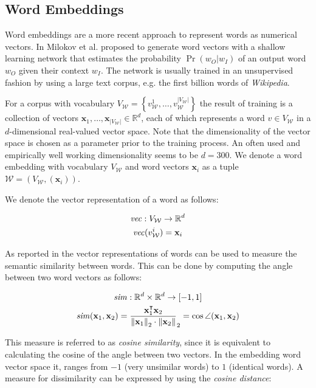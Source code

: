 \subsection{Word Embeddings}

Word embeddings are a more recent approach to represent words as numerical
vectors. In \cite{mikolov2013distributed} Milokov et al. proposed to generate
word vectors with a shallow learning network that estimates the
probability $\Pr(w_O|w_I)$ of an output word $w_O$ given their context $w_I$.
The network is usually trained in an unsupervised fashion by using a large
text corpus, e.g. the first billion words of \emph{Wikipedia}. 

For a corpus with vocabulary $V_\mathcal{W}=\left\{ v^1_\mathcal{W}, \ldots,
v^{|V_\mathcal{W}|}_\mathcal{W}\right\}$ the result of training is a collection
of vectors $\mathbf{x}_1, \ldots,\mathbf{x}_{|V_\mathcal{W}|} \in \mathbb{R}^d$, 
each of which represents a word $v \in V_\mathcal{W}$ in a
$d$-dimensional real-valued vector space. Note that the dimensionality of the
vector space is chosen as a parameter prior to the training process. An often
used and empirically well working dimensionality seems to be $d=300$. We
denote a word embedding with vocabulary $V_{\mathcal{W}}$ and 
word vectors $\mathbf{x}_i$ as a tuple $\mathcal{W}=(V_{\mathcal{W}},
(\mathbf{x}_i))$.

We denote the vector representation of a word as follows:

\begin{gather*}
	\mathit{vec}: V_\mathcal{W} \to \mathbb{R}^d \\
	\mathit{vec}(v^i_{\mathcal{W}}) = \mathbf{x}_i
\end{gather*}

As reported in \cite{mikolov2013distributed} the vector representations
of words can be used to measure the semantic similarity between words. This can
be done by computing the angle between two word vectors as follows:

\begin{gather*}
	\mathit{sim}: \mathbb{R}^d \times \mathbb{R}^d \to [-1, 1] \\
	\mathit{sim}(\mathbf{x}_1, \mathbf{x}_2) =
	\frac{\mathbf{x}_1^\intercal\mathbf{x}_2}{\left\lVert\mathbf{x}_1\right\rVert_2 \cdot
	\left\lVert\mathbf{x}_2\right\rVert}_2 = \cos \angle (\mathbf{x}_1, \mathbf{x}_2)
\end{gather*} 
 
This measure is referred to as \emph{cosine similarity}, since it is
equivalent to calculating the cosine of the angle between two vectors. In the
embedding word vector space it, ranges from $-1$ (very unsimilar words) to $1$
(identical words).
A measure for dissimilarity can be expressed by using the \emph{cosine distance}:

